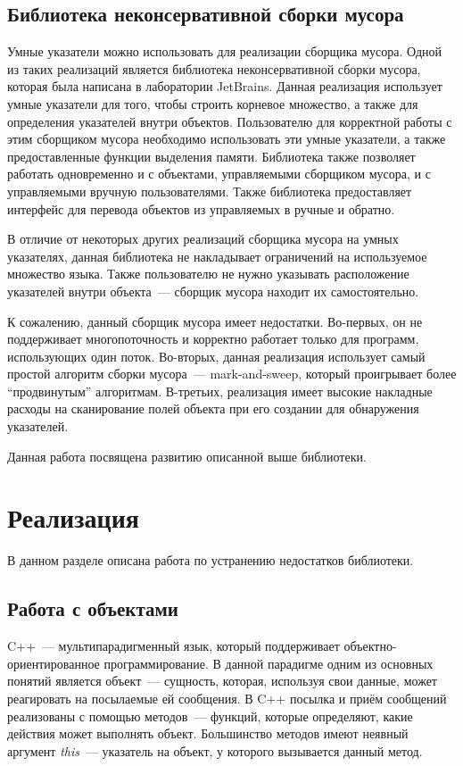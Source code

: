 \subsection{Библиотека неконсервативной сборки мусора}
Умные указатели можно использовать для реализации сборщика мусора. Одной из таких реализаций является библиотека неконсервативной сборки мусора, которая была написана в лаборатории JetBrains.
Данная реализация использует умные указатели для того, чтобы строить корневое множество, а также для определения указателей внутри объектов. Пользователю для корректной работы с этим сборщиком мусора необходимо использовать эти умные указатели, а также предоставленные функции выделения памяти.
Библиотека также позволяет работать одновременно и с объектами, управляемыми сборщиком мусора, и с управляемыми вручную пользователями. Также библиотека предоставляет интерфейс для перевода объектов из управляемых в ручные и обратно.

В отличие от некоторых других реализаций сборщика мусора на умных указателях, данная библиотека не накладывает ограничений на используемое множество языка.
Также пользователю не нужно указывать расположение указателей внутри объекта~--- сборщик мусора находит их самостоятельно.

К сожалению, данный сборщик мусора имеет недостатки. Во-первых, он не поддерживает многопоточность и корректно работает только для программ, использующих один поток. Во-вторых, данная реализация использует самый простой алгоритм сборки мусора~--- mark-and-sweep, который проигрывает более ``продвинутым'' алгоритмам.
В-третьих, реализация имеет высокие накладные расходы на сканирование полей объекта при его создании для обнаружения указателей.

Данная работа посвящена развитию описанной выше библиотеки.


\section{Реализация}
В данном разделе описана работа по устранению недостатков библиотеки.
\subsection{Работа с объектами}
C++~--- мультипарадигменный язык, который поддерживает
объектно-ориентированное программирование. В данной парадигме одним из основных
понятий является объект~--- сущность, которая, используя свои данные, может реагировать
на посылаемые ей сообщения. В C++ посылка и приём сообщений реализованы с помощью методов~--- 
функций, которые определяют, какие действия может выполнять объект. 
Большинство методов имеют неявный аргумент \textit{this}~--- указатель на объект,
у которого вызывается данный метод. 

